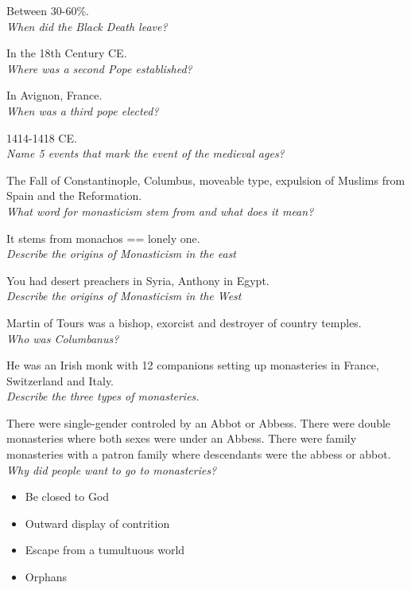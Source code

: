 \documentclass[12pt]{article}
\begin{document}
Between 30-60\%.\\

\textit{When did the Black Death leave?}

In the 18th Century CE. \\

\textit{Where was a second Pope established?}

In Avignon, France.\\

\textit{When was a third pope elected?}

1414-1418 CE.\\

\textit{Name 5 events that mark the event of the medieval ages?}

The Fall of Constantinople, Columbus, moveable type, expulsion of Muslims from Spain and the Reformation.\\

\textit{What word for monasticism stem from and what does it mean?}

It stems from monachos == lonely one.\\

\textit{Describe the origins of Monasticism in the east}

You had desert preachers in Syria, Anthony in Egypt.\\

\textit{Describe the origins of Monasticism in the West}

Martin of Tours was a bishop, exorcist and destroyer of country temples.\\

\textit{Who was Columbanus?}

He was an Irish monk with 12 companions setting up monasteries in France, Switzerland and Italy.\\

\textit{Describe the three types of monasteries.}

There were single-gender controled by an Abbot or Abbess. There were double monasteries where both sexes were under an Abbess. There were family monasteries with a patron family where descendants were the abbess or abbot.\\

\textit{Why did people want to go to monasteries?}
\begin{itemize}
	\item Be closed to God
	\item Outward display of contrition
	\item Escape from a tumultuous world
	\item Orphans
\end{itemize}
\end{document}
